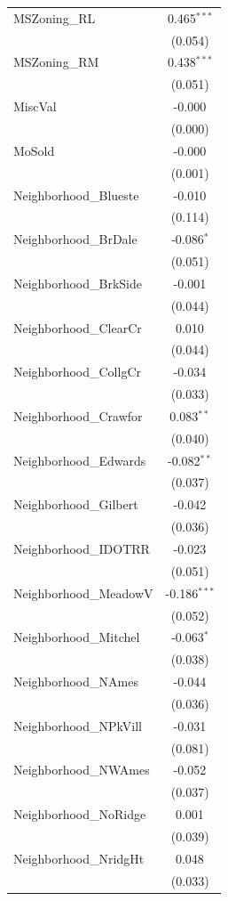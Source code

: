 \begin{table}[!htbp]
\begin{tabular}{@{\extracolsep{5pt}}lc}
 MSZoning\_RL & 0.465$^{***}$ \\
& (0.054) \\
 MSZoning\_RM & 0.438$^{***}$ \\
& (0.051) \\
 MiscVal & -0.000$^{}$ \\
& (0.000) \\
 MoSold & -0.000$^{}$ \\
& (0.001) \\
 Neighborhood\_Blueste & -0.010$^{}$ \\
& (0.114) \\
 Neighborhood\_BrDale & -0.086$^{*}$ \\
& (0.051) \\
 Neighborhood\_BrkSide & -0.001$^{}$ \\
& (0.044) \\
 Neighborhood\_ClearCr & 0.010$^{}$ \\
& (0.044) \\
 Neighborhood\_CollgCr & -0.034$^{}$ \\
& (0.033) \\
 Neighborhood\_Crawfor & 0.083$^{**}$ \\
& (0.040) \\
 Neighborhood\_Edwards & -0.082$^{**}$ \\
& (0.037) \\
 Neighborhood\_Gilbert & -0.042$^{}$ \\
& (0.036) \\
 Neighborhood\_IDOTRR & -0.023$^{}$ \\
& (0.051) \\
 Neighborhood\_MeadowV & -0.186$^{***}$ \\
& (0.052) \\
 Neighborhood\_Mitchel & -0.063$^{*}$ \\
& (0.038) \\
 Neighborhood\_NAmes & -0.044$^{}$ \\
& (0.036) \\
 Neighborhood\_NPkVill & -0.031$^{}$ \\
& (0.081) \\
 Neighborhood\_NWAmes & -0.052$^{}$ \\
& (0.037) \\
 Neighborhood\_NoRidge & 0.001$^{}$ \\
& (0.039) \\
 Neighborhood\_NridgHt & 0.048$^{}$ \\
& (0.033) \\

\end{tabular}
\end{table}
